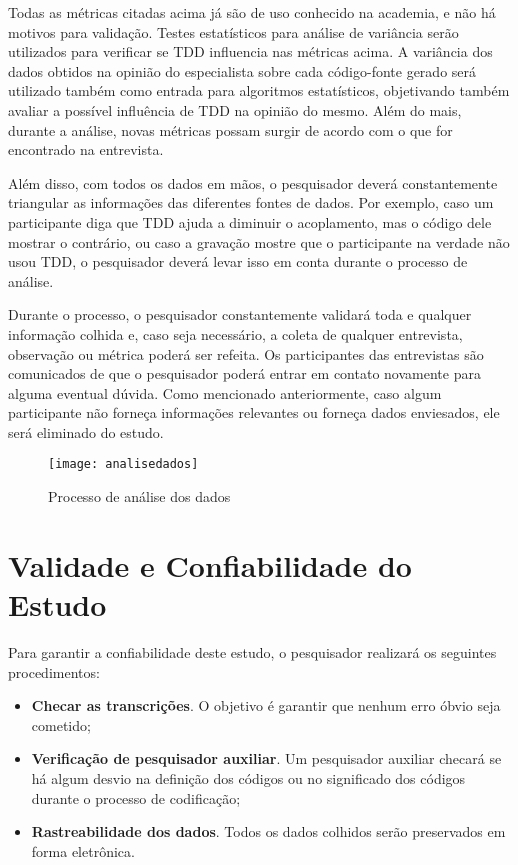 Todas as métricas citadas acima já são de uso conhecido na academia, e não há 
motivos para validação. Testes estatísticos para análise de variância serão utilizados
para verificar se TDD influencia nas métricas acima.
A variância dos dados obtidos na opinião do especialista sobre cada código-fonte gerado
será utilizado também como entrada para algoritmos estatísticos, objetivando também
avaliar a possível influência de TDD na opinião do mesmo. Além do mais, durante a análise, novas
métricas possam surgir de acordo com o que for encontrado na entrevista.

Além disso, com todos os dados em mãos, o pesquisador deverá constantemente triangular
as informações das diferentes fontes de dados. Por exemplo, caso um participante diga
que TDD ajuda a diminuir o acoplamento, mas o código dele mostrar o contrário, ou caso
a gravação mostre que o participante na verdade não usou TDD, o pesquisador
deverá levar isso em conta durante o processo de análise.

Durante o processo, o pesquisador constantemente validará toda e qualquer
informação colhida e, caso seja necessário, a coleta de qualquer entrevista,
observação ou métrica poderá ser refeita. Os participantes das entrevistas
são comunicados de que o pesquisador poderá entrar em contato
novamente para alguma eventual dúvida.
Como mencionado anteriormente, caso algum participante não forneça informações
relevantes ou forneça dados enviesados, ele será eliminado do estudo.

\begin{figure}
  \centering
  \texttt{[image: analisedados]}
  \caption{Processo de análise dos dados}
  \label{fig:analise-dados}
\end{figure}

\section{Validade e Confiabilidade do Estudo}
\label{sec:planejamento-validacao}

Para garantir a confiabilidade deste estudo, o pesquisador realizará os
seguintes procedimentos:

\begin{itemize}
	\item \textbf{Checar as transcrições}. O objetivo é garantir que nenhum erro
	óbvio seja cometido;

	\item \textbf{Verificação de pesquisador auxiliar}. Um pesquisador auxiliar
	checará se há algum desvio na definição dos códigos ou no significado dos códigos 
	durante o processo de codificação;
	
	\item \textbf{Rastreabilidade dos dados}. Todos os dados colhidos serão
	preservados em forma eletrônica.

\end{itemize}


